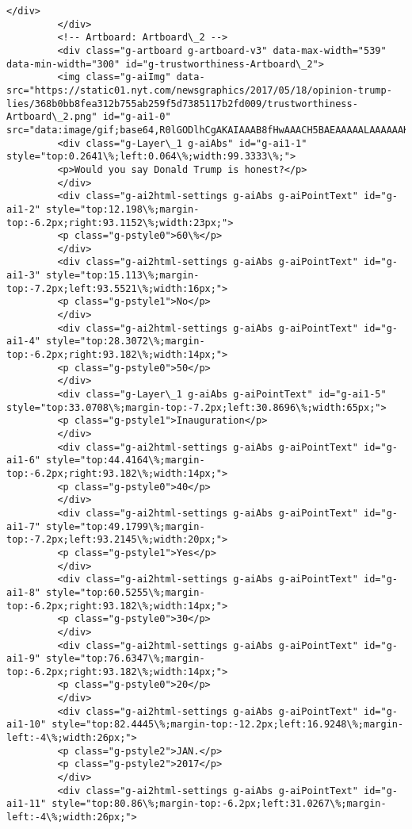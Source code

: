 \documentclass[11pt]{article}
\begin{document}
\begin{Verbatim}[commandchars=\\\{\}]
         </div>
         </div>
         <!-- Artboard: Artboard\_2 -->
         <div class="g-artboard g-artboard-v3" data-max-width="539" data-min-width="300" id="g-trustworthiness-Artboard\_2">
         <img class="g-aiImg" data-src="https://static01.nyt.com/newsgraphics/2017/05/18/opinion-trump-lies/368b0bb8fea312b755ab259f5d7385117b2fd009/trustworthiness-Artboard\_2.png" id="g-ai1-0" src="data:image/gif;base64,R0lGODlhCgAKAIAAAB8fHwAAACH5BAEAAAAALAAAAAAKAAoAAAIIhI+py+0PYysAOw=="/>
         <div class="g-Layer\_1 g-aiAbs" id="g-ai1-1" style="top:0.2641\%;left:0.064\%;width:99.3333\%;">
         <p>Would you say Donald Trump is honest?</p>
         </div>
         <div class="g-ai2html-settings g-aiAbs g-aiPointText" id="g-ai1-2" style="top:12.198\%;margin-top:-6.2px;right:93.1152\%;width:23px;">
         <p class="g-pstyle0">60\%</p>
         </div>
         <div class="g-ai2html-settings g-aiAbs g-aiPointText" id="g-ai1-3" style="top:15.113\%;margin-top:-7.2px;left:93.5521\%;width:16px;">
         <p class="g-pstyle1">No</p>
         </div>
         <div class="g-ai2html-settings g-aiAbs g-aiPointText" id="g-ai1-4" style="top:28.3072\%;margin-top:-6.2px;right:93.182\%;width:14px;">
         <p class="g-pstyle0">50</p>
         </div>
         <div class="g-Layer\_1 g-aiAbs g-aiPointText" id="g-ai1-5" style="top:33.0708\%;margin-top:-7.2px;left:30.8696\%;width:65px;">
         <p class="g-pstyle1">Inauguration</p>
         </div>
         <div class="g-ai2html-settings g-aiAbs g-aiPointText" id="g-ai1-6" style="top:44.4164\%;margin-top:-6.2px;right:93.182\%;width:14px;">
         <p class="g-pstyle0">40</p>
         </div>
         <div class="g-ai2html-settings g-aiAbs g-aiPointText" id="g-ai1-7" style="top:49.1799\%;margin-top:-7.2px;left:93.2145\%;width:20px;">
         <p class="g-pstyle1">Yes</p>
         </div>
         <div class="g-ai2html-settings g-aiAbs g-aiPointText" id="g-ai1-8" style="top:60.5255\%;margin-top:-6.2px;right:93.182\%;width:14px;">
         <p class="g-pstyle0">30</p>
         </div>
         <div class="g-ai2html-settings g-aiAbs g-aiPointText" id="g-ai1-9" style="top:76.6347\%;margin-top:-6.2px;right:93.182\%;width:14px;">
         <p class="g-pstyle0">20</p>
         </div>
         <div class="g-ai2html-settings g-aiAbs g-aiPointText" id="g-ai1-10" style="top:82.4445\%;margin-top:-12.2px;left:16.9248\%;margin-left:-4\%;width:26px;">
         <p class="g-pstyle2">JAN.</p>
         <p class="g-pstyle2">2017</p>
         </div>
         <div class="g-ai2html-settings g-aiAbs g-aiPointText" id="g-ai1-11" style="top:80.86\%;margin-top:-6.2px;left:31.0267\%;margin-left:-4\%;width:26px;">

\end{Verbatim}
\end{document}
